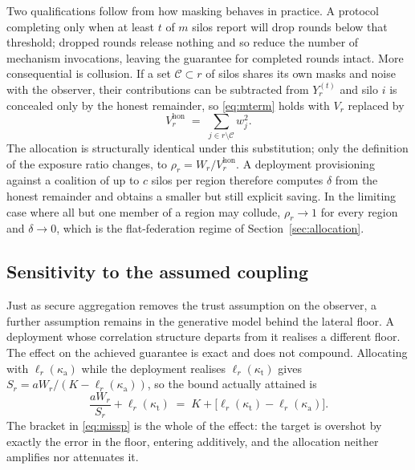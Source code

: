 \documentclass[acmsmall,screen,review,anonymous]{acmart}
\theoremstyle{acmdefinition}%
\begin{document}
Two qualifications follow from how masking behaves in practice. A protocol
completing only when at least $t$ of $m$ silos report will drop rounds below that
threshold; dropped rounds release nothing and so reduce the number of mechanism
invocations, leaving the guarantee for completed rounds intact. More consequential
is collusion. If a set $\mathcal{C} \subset r$ of silos shares its own masks and
noise with the observer, their contributions can be subtracted from $Y_r^{(t)}$ and
silo $i$ is concealed only by the honest remainder, so \eqref{eq:mterm} holds with
$V_r$ replaced by
\begin{equation}
V_r^{\mathrm{hon}} \;=\; \textstyle\sum_{j \in r \setminus \mathcal{C}} w_j^2 .
\end{equation}
The allocation is structurally identical under this substitution; only the
definition of the exposure ratio changes, to
$\rho_r = W_r / V_r^{\mathrm{hon}}$. A deployment provisioning against a coalition
of up to $c$ silos per region therefore computes $\delta$ from the honest remainder
and obtains a smaller but still explicit saving. In the limiting case where all but
one member of a region may collude, $\rho_r \to 1$ for every region and $\delta \to
0$, which is the flat-federation regime of Section~\ref{sec:allocation}.

\subsection{Sensitivity to the assumed coupling}

Just as secure aggregation removes the trust assumption on the observer, a further
assumption remains in the generative model behind the lateral floor. A deployment
whose correlation structure departs from it realises a different floor. The effect
on the achieved guarantee is exact and does not compound. Allocating with
$\ell_r(\kappa_{\mathrm{a}})$ while the deployment realises $\ell_r(\kappa_{\mathrm{t}})$
gives $S_r = aW_r/(K - \ell_r(\kappa_{\mathrm{a}}))$, so the bound actually attained is
\begin{equation}
\frac{aW_r}{S_r} + \ell_r(\kappa_{\mathrm{t}})
\;=\; K + \big[\ell_r(\kappa_{\mathrm{t}}) - \ell_r(\kappa_{\mathrm{a}})\big].
\label{eq:missp}
\end{equation}
The bracket in \eqref{eq:missp} is the whole of the effect: the target is overshot
by exactly the error in the floor, entering additively, and the allocation neither
amplifies nor attenuates it.
\end{document}
